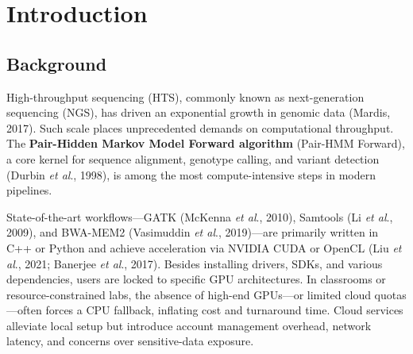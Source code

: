 \documentclass[PhD]{PHlab-thesis}
\begin{document}



\printnomenclature[5cm]

\newpage
\setcounter{page}{1}

\chapter{Introduction}

\section{Background}
High-throughput sequencing (HTS), commonly known as next-generation sequencing (NGS), has driven an exponential growth in genomic data (Mardis, 2017). Such scale places unprecedented demands on computational throughput.  
The \textbf{Pair-Hidden Markov Model Forward algorithm} (Pair-HMM Forward), a core kernel for sequence alignment, genotype calling, and variant detection (Durbin \emph{et al}., 1998), is among the most compute-intensive steps in modern pipelines.

State-of-the-art workflows—GATK (McKenna \emph{et al}., 2010), Samtools (Li \emph{et al}., 2009), and BWA-MEM2 (Vasimuddin \emph{et al}., 2019)—are primarily written in C++ or Python and achieve acceleration via NVIDIA CUDA or OpenCL (Liu \emph{et al}., 2021; Banerjee \emph{et al}., 2017). Besides installing drivers, SDKs, and various dependencies, users are locked to specific GPU architectures. In classrooms or resource-constrained labs, the absence of high-end GPUs—or limited cloud quotas—often forces a CPU fallback, inflating cost and turnaround time.  
Cloud services alleviate local setup but introduce account management overhead, network latency, and concerns over sensitive-data exposure.
\end{document}
